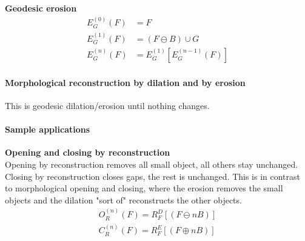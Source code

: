 \textbf{Geodesic erosion}
\begin{align*}
	E_G^{(0)}(F) &= F \\
	E_G^{(1)}(F) &= (F\ominus B)\cup G \\
	E_G^{(n)}(F) &= E_G^{(1)}[E_G^{(n-1)}(F)]
\end{align*}

\paragraph{Morphological reconstruction by dilation and by erosion}
This is geodesic dilation/erosion until nothing changes.

\paragraph{Sample applications}
\textbf{Opening and closing by reconstruction}\\
Opening by reconstruction removes all small object, all others stay unchanged.
Closing by reconstruction closes gaps, the rest is unchanged. This is in contrast to morphological opening and closing, where the erosion removes the small objects and the dilation "sort of" reconstructs the other objects.\\
\begin{align*}
O_R^{(n)}(F)=R_F^D[(F\ominus nB)]\\
C_R^{(n)}(F)=R_F^E[(F\oplus nB)]
\end{align*}

